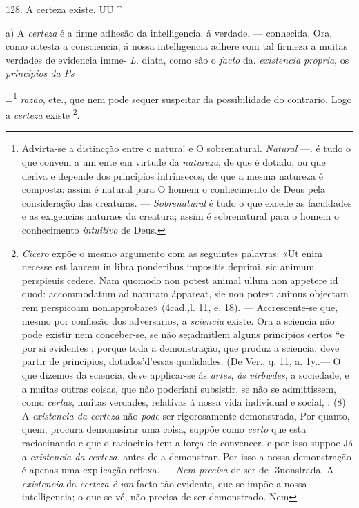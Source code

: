 128. A certeza existe. UU \textasciicircum{}

a) A \emph{certeza} é a firme adhesão da intelligencia. á verdade. --- conhecida. Ora, como attesta a consciencia, á nossa intelhgencia adhere com tal firmeza a muitas verdades de evidencia imme- \emph{L}. diata, como são o \emph{facto} da. \emph{existencia propria}, os \emph{principios da Ps}

\textbar{} =\footnote{Advirta-se a distincção entre o natura! e O sobrenatural. \emph{Natural} ---. é tudo o que convem a um ente em virtude da \emph{natureza}, de que é dotado, ou que deriva e depende dos principios intrinsecos, de que a mesma natureza é composta: assim é natural para O homem o conhecimento de Deus pela consideração das creaturas. --- \emph{Sobrenatural} é tudo o que excede as faculdades e as exigencias naturaes da creatura; assim é sobrenatural para o homem o conhecimento \emph{intuitivo} de Deus.}   \emph{razão}, ete., que nem pode sequer suspeitar da possibilidade do contrario. Logo a \emph{certeza} existe \footnote{\emph{Cicero} expõe o mesmo argumento com as seguintes palavras: «Ut enim necesse est lancem in libra ponderibus impositis deprimi, sic animum perspieuis cedere. Nam quomodo non potest animal ullum non appetere id quod: accommodatum ad naturam áppareat, sie non potest animus objectam rem perspicoam non.approbare» (4cad.,l. 11, e. 18). --- Accrescente-se que, mesmo por confissão dos adversarios, a \emph{sciencia} existe. Ora a sciencia não pode existir nem conceber-se, se não se;admitlem alguns principios certos “e por si evidentes ; porque toda a demonstração, que produz a sciencia, deve partir de principios, dotados'd'essas qualidades. (De Ver., q. 11, a. 1y..--- O que dizemos da sciencia, deve applicar-se ás \emph{artes}, \emph{ás virbwdes}, a sociedade, e a muitas outras coisas, que não poderiani subsistir, se não se admittissem, como \emph{certas}, muitas verdades, relativas á nossa vida individual e social, : (8) A \emph{existencia da certeza} não \emph{pode} ser rigorosamente demonstrada, Por quanto, quem, procura demonusirar uma coisa, suppõe como \emph{certo} que esta raciocinando e que o raciocinio tem a força de convencer. e por isso suppoe Já a \emph{existencia da certeza}, antes de a demonstrar. Por isso a nossa demonstração é apenas uma explicação reflexa. --- \emph{Nem precisa} de ser de- 3uonslrada. A \emph{existencia} da \emph{certeza é um} facto tão evidente, que se impõe a nossa intelligencia; o que se vé, não precisa de ser demonstrado. Nem}.

